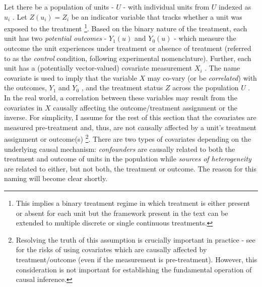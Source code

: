 \documentclass[../main.tex]{subfiles}
\begin{document}
\vspace{\baselineskip}
Let there be a population of units -  \( U \) - with individual units from  \( U \)  indexed as  \( u_{i} \) . Let  \( Z \left( u_{i} \right)  = Z_{i} \) be an indicator variable that tracks whether a unit was exposed to the treatment \footnote{ This implies a binary treatment regime in which treatment is either present or absent for each unit but the framework present in the text can be extended to multiple discrete or single continuous treatments. }. Based on the binary nature of the treatment, each unit has two \textit{potential outcomes }-  \( Y_{1} \left( u \right)  \) and  \( Y_{0} \left( u \right)  \)  - which measure the outcome the unit experiences under treatment or absence of treatment (referred to as the \textit{control }condition, following experimental nomenclature). Further, each unit has a (potentially vector-valued) covariate measurement  \( X_{i} \) . The name covariate is used to imply that the variable  \( X \) may co-vary (or be \textit{correlated}) with the outcomes,  \( Y_{1} \) and  \( Y_{0} \) , and the treatment status  \( Z \) across the population \( U \) . In the real world, a correlation between these variables may result from the covariates in  \( X \) causally affecting the outcome/treatment assignment or the inverse. For simplicity, I assume for the rest of this section that the covariates are measured pre-treatment and, thus, are not causally affected by a unit’s treatment assignment or outcome(s) \footnote{ Resolving the truth of this assumption is crucially important in practice - see \cite{Pearl2009CausalOverview} for the risks of using covariates which are causally affected by treatment/outcome (even if the measurement is pre-treatment). However, this consideration is not important for establishing the fundamental operation of causal inference. }. There are two types of covariates depending on the underlying causal mechanism: \textit{confounders} are causally related to both the treatment and outcome of units in the population while \textit{sources of heterogeneity }are related to either, but not both, the treatment or outcome. The reason for this naming will become clear shortly.\par
\end{document}
